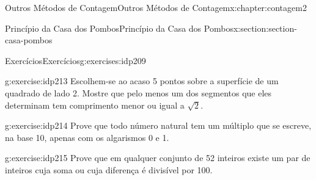 \documentclass[oneside,10pt,]{book}
\numberwithin{equation}{section}
\begin{document}
\begin{chapterptx}{Outros Métodos de Contagem}{}{Outros Métodos de Contagem}{}{}{x:chapter:contagem2}
\begin{sectionptx}{Princípio da Casa dos Pombos}{}{Princípio da Casa dos Pombos}{}{}{x:section:section-casa-pombos}
\begin{exercises-subsection}{Exercícios}{}{Exercícios}{}{}{g:exercises:idp209}
\begin{divisionexercise}{3}{}{}{g:exercise:idp213}%
Escolhem-se ao acaso 5 pontos sobre a superfície de um quadrado de lado 2. Mostre que pelo menos um dos segmentos que eles determinam tem comprimento menor ou igual a \(\sqrt{2}\).%
\end{divisionexercise}%
\begin{divisionexercise}{4}{}{}{g:exercise:idp214}%
Prove que todo número natural tem um múltiplo que se escreve, na base 10, apenas com os algarismos 0 e 1.%
\end{divisionexercise}%
\begin{divisionexercise}{5}{}{}{g:exercise:idp215}%
Prove que em qualquer conjunto de 52 inteiros existe um par de inteiros cuja soma ou cuja diferença é divisível por 100.%
\end{divisionexercise}%
\end{exercises-subsection}
\end{sectionptx}
\end{chapterptx}
%
%
\typeout{************************************************}
\typeout{************************************************}
%
\end{document}
